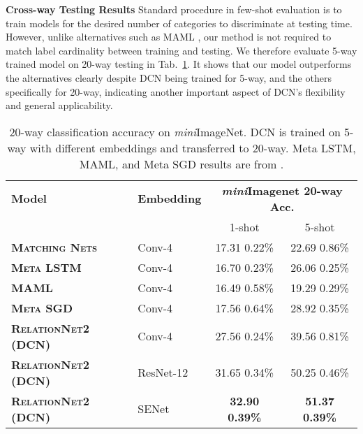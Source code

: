 \documentclass[conference]{IEEEtran}
\def\modelnameshort{DCN}
\def\miniIN{\textit{mini}ImageNet}
\newcommand{\keypoint}[1]{\vspace{0.05cm}\noindent\textbf{#1}\quad}
\begin{document}
\keypoint{Cross-way Testing Results}
Standard procedure in few-shot evaluation is to train models for the desired number of categories to discriminate at testing time. However, unlike alternatives such as MAML \cite{finn2017model}, our method is not required to match label cardinality between training and testing. We therefore evaluate 5-way trained model on 20-way testing in Tab.~\ref{tab:ablation2}. It shows that our model outperforms the alternatives clearly despite \modelnameshort{} being trained for 5-way, and the others specifically for 20-way, indicating another important aspect of \modelnameshort{}'s flexibility and general applicability. 

\setlength{\tabcolsep}{4.8pt}
\begin{table}[t]
\centering
\footnotesize
\begin{tabular}{@{} llcc @{}}
\toprule
\multirow{2}{*}{\bf Model}  & \multirow{2}{*}{\bf Embedding}  & \multicolumn{2}{c}{\multirow{2}{*}{\bf \textit{mini}Imagenet 20-way Acc.}}\\
& \multicolumn{2}{c}{}  \\
& & 1-shot & 5-shot \\
\midrule 
\textbf{\textsc{Matching Nets}} \cite{li2017meta} & Conv-4 & 17.31  0.22\% &  22.69  0.86\%  \\ 
\textbf{\textsc{Meta LSTM}} \cite{li2017meta}& Conv-4 & 16.70  0.23\% &  26.06  0.25\%   \\
\textbf{\textsc{MAML}} \cite{li2017meta}& Conv-4 & 16.49  0.58\%  &  19.29  0.29\%   \\
\textbf{\textsc{Meta SGD}} \cite{li2017meta}& Conv-4 & 17.56  0.64\%  &  28.92  0.35\% \\ 
\midrule  
\textbf{\textsc{RelationNet2 (\modelnameshort{})}} & Conv-4 &27.56  0.24\% & 39.56  0.81\%\\
\textbf{\textsc{RelationNet2 (\modelnameshort{})}}  & ResNet-12 &31.65  0.34\% & 50.25  0.46\%\\
\textbf{\textsc{RelationNet2 (\modelnameshort{})}} & SENet &\textbf{32.90  0.39\%} & \textbf{51.37  0.39\%} \\ 


\bottomrule
\end{tabular}\caption{\small \small
20-way classification accuracy on \miniIN{}. \modelnameshort{} is trained on 5-way with different embeddings and transferred to 20-way. Meta LSTM, MAML, and Meta SGD results are from \cite{li2017meta}. 
}
\label{tab:ablation2}
\end{table}
\end{document}
